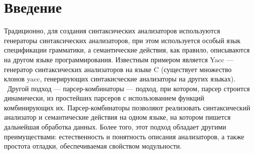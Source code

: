 \documentclass[14pt]{matmex-diploma}
\begin{document}
\maketitle
\tableofcontents
\section*{Введение}
Традиционно, для создания синтаксических анализаторов используются генераторы 
синтаксических анализаторов, при этом используется особый язык спецификации 
грамматики, а семантические действия, как правило, 
описываются на другом языке программирования.
Известным примером является Yacc \cite{johnson1975yacc} --- генератор синтаксических анализаторов на языке C 
(существует множество клонов yacc, генерирующих синтакисческие анализаторы на других языках). \ 
Другой подход --- парсер-комбинаторы --- подход, при котором, парсер строится динамически, 
из простейших парсеров с использованием функций комбинирующих их. Парсер-комбинаторы позволяют 
реализовать синтаксический анализатор и семантические действия на одном языке, 
на котором пишется дальнейшая обработка данных. 
Более того, этот подход обладает другими преимуществами: 
  естественность и понятность описания анализаторов, а также простота отладки,
  обеспечиваемая свойством модульности. 
\end{document}
